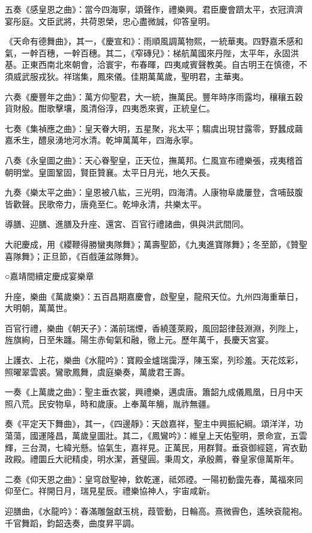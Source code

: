 五奏《感皇恩之曲》：當今四海寧，頌聲作，禮樂興。君臣慶會躋太平，衣冠濟濟宴彤庭。文臣武將，共荷恩榮，忠心盡微誠，仰答皇明。

《天命有德舞曲》，其一，《慶宣和》：雨順風調萬物熙，一統華夷。四野嘉禾感和氣，一幹百穗，一幹百穗。其二，《窄磚兒》：梯航萬國來丹陛，太平年，永固洪基。正東西南北來朝會，洽寰宇，布春暉，四夷咸賓聲教美。自古明王在慎德，不須威武服戎狄。祥瑞集，鳳來儀。佳期萬萬歲，聖明君，主華夷。

六奏《慶豐年之曲》：萬方仰聖君，大一統，撫萬民。豐年時序雨露均，穰穰五穀貨財殷。酣歌擊壤，風清俗淳，四夷悉來賓，正統皇仁。

七奏《集禎應之曲》：皇天眷大明，五星聚，兆太平；騶虞出現甘露零，野蠶成繭嘉禾生，醴泉湧地河水清。乾坤萬萬年，四海永寧。

八奏《永皇圖之曲》：天心眷聖皇，正天位，撫萬邦。仁風宣布禮樂張，戎夷稽首朝明堂。皇圖鞏固，賢臣贊襄。太平日月光，地久天長。

九奏《樂太平之曲》：皇恩被八紘，三光明，四海清。人康物阜歲屢登，含哺鼓腹皆歡聲。民歌帝力，唐堯至仁。乾坤永清，共樂太平。

導膳、迎膳、進膳及升座、還宮、百官行禮諸曲，俱與洪武間同。

大祀慶成，用《纓鞭得勝蠻夷隊舞》；萬壽聖節，《九夷進寶隊舞》；冬至節，《贊聖喜隊舞》；正旦節，《百戲蓮盆隊舞》。

○嘉靖間續定慶成宴樂章

升座，樂曲《萬歲樂》：五百昌期嘉慶會，啟聖皇，龍飛天位。九州四海重華日，大明朝，萬萬世。

百官行禮，樂曲《朝天子》：滿前瑞煙，香繞蓬萊殿，風回韶律鼓淵淵，列陛上，旌旗絢，日至朱躔。陽生赤甸氣和融，徹上元。歷年萬千，長慶天宮宴。

上護衣、上花，樂曲《水龍吟》：寶殿金爐瑞靄浮，陳玉案，列珍羞。天花炫彩，照曜翠雲裘。鸞歌鳳舞，虞庭樂奏，萬歲君王壽。

一奏《上萬歲之曲》：聖主垂衣裳，興禮樂，邁虞唐。簫韶九成儀鳳凰，日月中天照八荒。民安物阜，時和歲康。上奉萬年觴，胤祚無疆。

奏《平定天下舞曲》，其一，《四邊靜》：天啟嘉祥，聖主中興振紀綱。頌洋洋，功蕩蕩，國運隆昌，萬歲皇圖壯。其二，《鳳鸞吟》：維皇上天佑聖明，景命宣，五雲輝，三台潤，七緯光懸。協氣生，嘉祥見。正萬民，用群賢。垂袞御經筵，宵衣勤政殿。禮圜丘大祀精虔，明水潔，蒼璧圓。秉周文，承殷薦，眷皇家億萬斯年。

二奏《仰天恩之曲》：皇穹啟聖神，欽乾運，祗郊禋。一陽初動靄先春，萬福來同仰至仁。祥開日月，瑞見星辰。禮樂協神人，宇宙咸新。

迎膳曲，《水龍吟》：春滿雕盤獻玉桃，葭管動，日輪高。熹微霽色，遙映袞龍袍。千官舞蹈，鈞韶迭奏，曲度昇平調。

